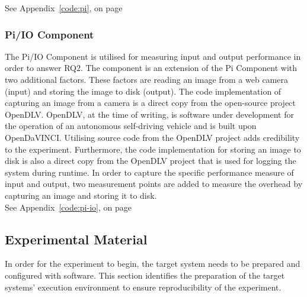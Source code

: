 See Appendix~\ref{code:pi}, on page ~\pageref{code:pi}

\subsubsection*{Pi/IO Component}
The Pi/IO Component is utilised for measuring input and output performance in order to answer RQ2. The component is an extension of the Pi Component with two additional factors. These factors are reading an image from a web camera (input) and storing the image to disk (output). The code implementation of capturing an image from a camera is a direct copy from the open-source project OpenDLV. OpenDLV, at the time of writing, is software under development for the operation of an autonomous self-driving vehicle and is built upon OpenDaVINCI. Utilising source code from the OpenDLV project adds credibility to the experiment. Furthermore, the code implementation for storing an image to disk is also a direct copy from the OpenDLV project that is used for logging the system during runtime. In order to capture the specific performance measure of input and output, two measurement points are added to measure the overhead by capturing an image and storing it to disk. \\


See Appendix~\ref{code:pi-io}, on page ~\pageref{code:pi-io}


\subsection{Experimental Material}
\label{section:exp-material}
In order for the experiment to begin, the target system needs to be prepared and configured with software. This section identifies the preparation of the target systems' execution environment to ensure reproducibility of the experiment.

